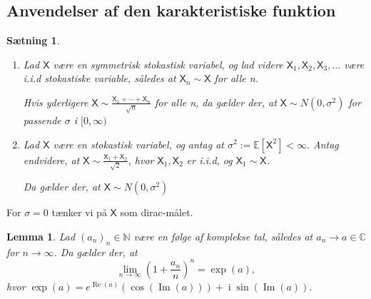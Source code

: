 \documentclass{article}
\newcommand{\N}{\mathbb{N}}
\newcommand{\C}{\mathbb{C}}
\newcommand{\E}{\mathbb{E}}
\newcommand{\1}{\mathbbm{1}}
\newcommand{\X}{\mathsf{X}}
\newcommand{\icomp}{\operatorname{i}}
\theoremstyle{boxed}
\newtheorem{lemma}[theorem]{Lemma}
\newtheorem{proposition}[theorem]{Sætning}
\begin{document}
\subsection{Anvendelser af den karakteristiske funktion}
\begin{theorem-box}
    \begin{proposition}
        \begin{enumerate}
            \item[\textnormal{(i)}] Lad $\X$ være en symmetrisk stokastisk variabel, og lad videre $\X_1,\X_2,\X_3,\dots$ være i.i.d stokastiske variable, således at $\X_n\sim \X$ for alle n.
            
            Hvis yderligere $\X\sim\frac{\X_1+\cdots+\X_n}{\sqrt{n}}$ for alle n, da gælder der, at $\X\sim N(0,\sigma^2)$ for passende $\sigma$ i $[0,\infty)$
            \item[\textnormal{(ii)}] Lad $\X$ være en stokastisk variabel, og antag at $\sigma^2:=\E[\X^2]<\infty.$ Antag endvidere, at $\X\sim\frac{\X_1+\X_2}{\sqrt{2}}$, hvor $\X_1,\X_2$ er i.i.d, og $\X_1\sim \X$.

            Da gælder der, at $\X\sim N(0,\sigma^2)$
        \end{enumerate}
    \end{proposition}
\end{theorem-box}
For $\sigma=0$ tænker vi på $\X$ som dirac-målet.
\begin{theorem-box}
    \begin{lemma}
        Lad $(a_n)_n\in\N$ være en følge af komplekse tal, således at $a_n\longrightarrow a \in\C$ for $n\rightarrow \infty$. Da gælder der, at $$\lim_{n\rightarrow\infty}\left(1+\frac{a_n}{n}\right)^n=\exp(a),$$
        hvor $\exp(a)=e^{\operatorname{Re}(a)}(\cos(\operatorname*{Im}(a)))+\icomp\sin(\operatorname{Im}(a)).$
    \end{lemma}
\end{theorem-box}
\end{document}
